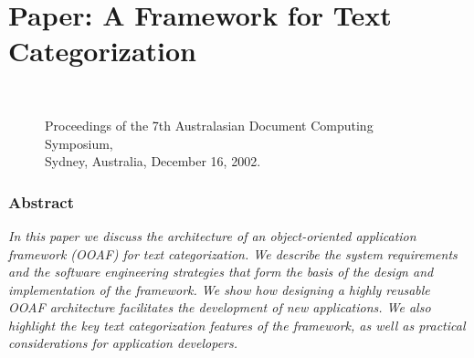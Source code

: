 \chapter{Paper: A Framework for Text Categorization}

\begin{singlespace}

\begin{comment}
\title{A Framework for Text Categorization}

\author{
{\em Ken Williams}\\[1ex]
Web Engineering Group\\
The University of Sydney\\
Bldg J03, Sydney NSW 2006\\[1ex]
{\em kenw@ee.usyd.edu.au}
\and
{\em Rafael A. Calvo}\\[1ex]
Web Engineering Group\\
The University of Sydney\\
Bldg J03, Sydney NSW 2006\\[1ex]
{\em rafa@ee.usyd.edu.au}
}
\date{}


\maketitle
\end{comment}

\thispagestyle{empty}


        \begin{figure}[b]
	~\\
        \noindent
        {\small\bf\raggedright
        Proceedings of the 7th Australasian 
	Document Computing Symposium,\\
	Sydney, Australia,
        December 16, 2002.
        }
        \end{figure}


\subsection*{\centering Abstract}
\noindent
{\it 
In this paper we discuss the architecture of an object-oriented
application framework (OOAF) for text categorization. We describe the
system requirements and the software engineering strategies that
form the basis of the design and implementation of the framework.  We show how
designing a highly reusable OOAF architecture facilitates the
development of new applications.  We also highlight the key text
categorization features of the framework, as well as practical
considerations for application developers.
}


\end{singlespace}
